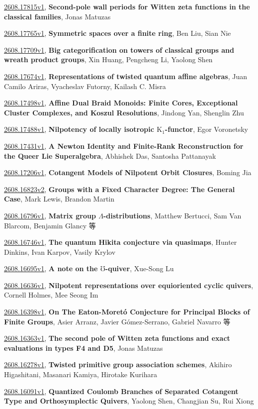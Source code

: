 \documentclass[9pt, a4paper]{article}
\theoremstyle{plain}
\theoremstyle{definition}
\theoremstyle{remark}
\newcommand{\arxiv}[3]{\href{https://arxiv.org/abs/#1}{#1}, \textbf{\textcolor{arxivblue}{#2}}, #3}
\begin{document}
\arxiv{2608.17815v1}{Second-pole wall periods for Witten zeta functions in the classical families}{Jonas Matuzas}

\arxiv{2608.17765v1}{Symmetric spaces over a finite ring}{Ben Liu, Sian Nie}

\arxiv{2608.17709v1}{Big categorification on towers of classical groups and wreath product groups}{Xin Huang, Pengcheng Li, Yaolong Shen}

\arxiv{2608.17674v1}{Representations of twisted quantum affine algebras}{Juan Camilo Ariras, Vyacheslav Futorny, Kailash C. Misra}

\arxiv{2608.17498v1}{Affine Dual Braid Monoids: Finite Cores, Exceptional Cluster Complexes, and Koszul Resolutions}{Jindong Yan, Shenglin Zhu}

\arxiv{2608.17488v1}{Nilpotency of locally isotropic $ \mathrm{K}_1 $-functor}{Egor Voronetsky}

\arxiv{2608.17431v1}{A Newton Identity and Finite-Rank Reconstruction for the Queer Lie Superalgebra}{Abhishek Das, Santosha Pattanayak}

\arxiv{2608.17206v1}{Cotangent Models of Nilpotent Orbit Closures}{Boming Jia}

\arxiv{2608.16823v2}{Groups with a Fixed Character Degree: The General Case}{Mark Lewis, Brandon Martin}

\arxiv{2608.16796v1}{Matrix group $Λ$-distributions}{Matthew Bertucci, Sam Van Blarcom, Benjamin Glancy 等}

\arxiv{2608.16746v1}{The quantum Hikita conjecture via quasimaps}{Hunter Dinkins, Ivan Karpov, Vasily Krylov}

\arxiv{2608.16695v1}{A note on the $\mho$-quiver}{Xue-Song Lu}

\arxiv{2608.16636v1}{Nilpotent representations over equioriented cyclic quivers}{Cornell Holmes, Mee Seong Im}

\arxiv{2608.16398v1}{On The Eaton-Moretó Conjecture for Principal Blocks of Finite Groups}{Asier Arranz, Javier Gómez-Serrano, Gabriel Navarro 等}

\arxiv{2608.16363v1}{The second pole of Witten zeta functions and exact evaluations in types F4 and D5}{Jonas Matuzas}

\arxiv{2608.16278v1}{Twisted primitive group association schemes}{Akihiro Higashitani, Masanari Kamiya, Hirotake Kurihara}

\arxiv{2608.16091v1}{Quantized Coulomb Branches of Separated Cotangent Type and Orthosymplectic Quivers}{Yaolong Shen, Changjian Su, Rui Xiong}
\end{document}
